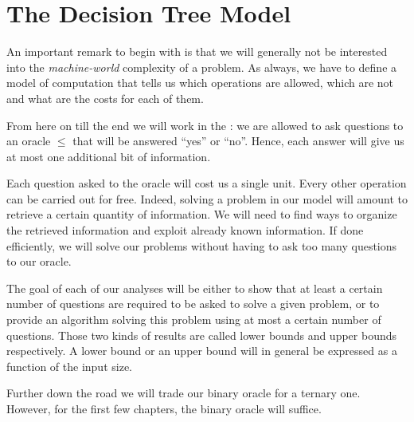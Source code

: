 \section{The Decision Tree Model}
\label{tree:sorting:model}

An important remark to begin with is that we will generally not be interested
into the \emph{machine-world} complexity of a problem. As always, we have to
define a model of computation that tells us which operations are allowed, which
are not and what are the costs for each of them.

From here on till the end we will work in the :
we are allowed to ask questions to an oracle \(\le\) that will be answered
``yes'' or ``no''. Hence, each answer will give us at most
one additional bit of information.

Each question asked to the oracle will cost us a single unit.
Every other operation can be carried out for free. Indeed, solving a problem in
our model will amount to retrieve a certain quantity of information. We will
need to find ways to organize the retrieved information and exploit already
known information. If done efficiently, we will solve our problems without
having to ask too many questions to our oracle.

The goal of each of our analyses will be either to show that at least a certain
number of questions are required to be asked to solve a given problem, or to
provide an algorithm solving this problem using at most a certain number of
questions. Those two kinds of results are called lower bounds and upper bounds
respectively. A lower bound or an upper bound will in general be expressed as
a function of the input size.

Further down the road we will trade our binary oracle for a ternary one.
However, for the first few chapters, the binary oracle will suffice.

